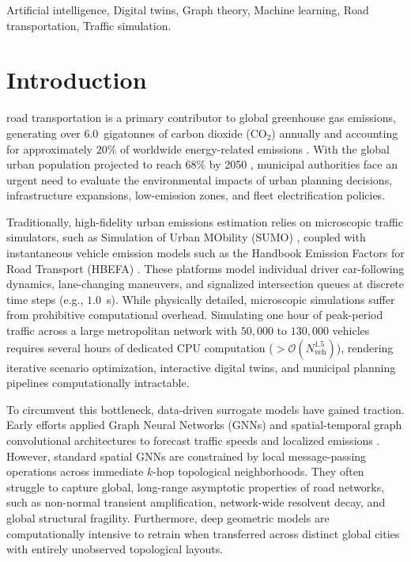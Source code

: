 \documentclass[journal]{IEEEtran}
\begin{document}
\begin{IEEEkeywords}
Artificial intelligence, Digital twins, Graph theory, Machine learning, Road transportation, Traffic simulation.
\end{IEEEkeywords}

\IEEEpeerreviewmaketitle

\section{Introduction}

 road transportation is a primary contributor to global greenhouse gas emissions, generating over $6.0$~gigatonnes of carbon dioxide ($\text{CO}_2$) annually and accounting for approximately $20\%$ of worldwide energy-related emissions \cite{IEA2023, UN2022}. With the global urban population projected to reach $68\%$ by 2050 \cite{UN2022}, municipal authorities face an urgent need to evaluate the environmental impacts of urban planning decisions, infrastructure expansions, low-emission zones, and fleet electrification policies.

Traditionally, high-fidelity urban emissions estimation relies on microscopic traffic simulators, such as Simulation of Urban MObility (SUMO) \cite{Krajzewicz2012}, coupled with instantaneous vehicle emission models such as the Handbook Emission Factors for Road Transport (HBEFA) \cite{Kratzsch2020, Keller2017}. These platforms model individual driver car-following dynamics, lane-changing maneuvers, and signalized intersection queues at discrete time steps (e.g., $1.0$~s). While physically detailed, microscopic simulations suffer from prohibitive computational overhead. Simulating one hour of peak-period traffic across a large metropolitan network with $50,000$ to $130,000$ vehicles requires several hours of dedicated CPU computation ($>\mathcal{O}(N_{\text{veh}}^{1.5})$), rendering iterative scenario optimization, interactive digital twins, and municipal planning pipelines computationally intractable.

To circumvent this bottleneck, data-driven surrogate models have gained traction. Early efforts applied Graph Neural Networks (GNNs) \cite{Kipf2017} and spatial-temporal graph convolutional architectures to forecast traffic speeds and localized emissions \cite{Yu2018, Wu2020, Wang2023, SAGE2024}. However, standard spatial GNNs are constrained by local message-passing operations across immediate $k$-hop topological neighborhoods. They often struggle to capture global, long-range asymptotic properties of road networks, such as non-normal transient amplification, network-wide resolvent decay, and global structural fragility. Furthermore, deep geometric models are computationally intensive to retrain when transferred across distinct global cities with entirely unobserved topological layouts.
\end{document}
